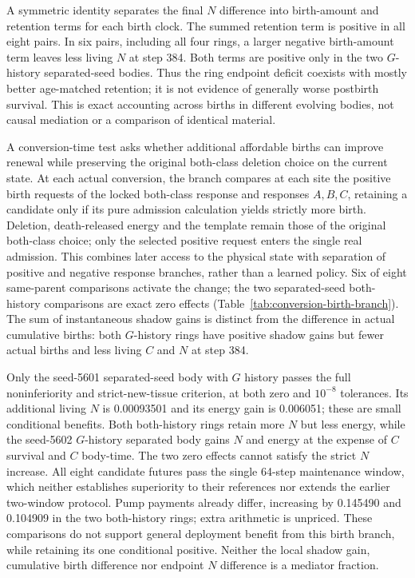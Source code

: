 A symmetric identity separates the final $N$ difference into birth-amount and retention terms for each birth clock. The summed retention term is positive in all eight pairs. In six pairs, including all four rings, a larger negative birth-amount term leaves less living $N$ at step 384. Both terms are positive only in the two $G$-history separated-seed bodies. Thus the ring endpoint deficit coexists with mostly better age-matched retention; it is not evidence of generally worse postbirth survival. This is exact accounting across births in different evolving bodies, not causal mediation or a comparison of identical material.



A conversion-time test asks whether additional affordable births can improve renewal while preserving the original both-class deletion choice on the current state. At each actual conversion, the branch compares at each site the positive birth requests of the locked both-class response and responses $A,B,C$, retaining a candidate only if its pure admission calculation yields strictly more birth. Deletion, death-released energy and the template remain those of the original both-class choice; only the selected positive request enters the single real admission. This combines later access to the physical state with separation of positive and negative response branches, rather than a learned policy. Six of eight same-parent comparisons activate the change; the two separated-seed both-history comparisons are exact zero effects (Table~\ref{tab:conversion-birth-branch}). The sum of instantaneous shadow gains is distinct from the difference in actual cumulative births: both $G$-history rings have positive shadow gains but fewer actual births and less living $C$ and $N$ at step 384.

Only the seed-5601 separated-seed body with $G$ history passes the full noninferiority and strict-new-tissue criterion, at both zero and $10^{-8}$ tolerances. Its additional living $N$ is 0.00093501 and its energy gain is 0.006051; these are small conditional benefits. Both both-history rings retain more $N$ but less energy, while the seed-5602 $G$-history separated body gains $N$ and energy at the expense of $C$ survival and $C$ body-time. The two zero effects cannot satisfy the strict $N$ increase. All eight candidate futures pass the single 64-step maintenance window, which neither establishes superiority to their references nor extends the earlier two-window protocol. Pump payments already differ, increasing by 0.145490 and 0.104909 in the two both-history rings; extra arithmetic is unpriced. These comparisons do not support general deployment benefit from this birth branch, while retaining its one conditional positive. Neither the local shadow gain, cumulative birth difference nor endpoint $N$ difference is a mediator fraction.

